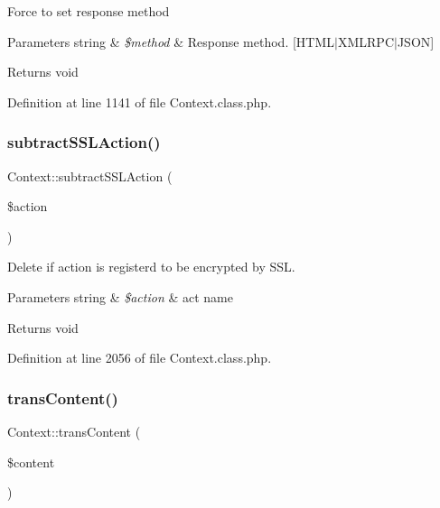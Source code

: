 Force to set response method


\begin{DoxyParams}[1]{Parameters}
string & {\em \$method} & Response method. \mbox{[}H\+T\+M\+L$\vert$\+X\+M\+L\+R\+P\+C$\vert$\+J\+S\+ON\mbox{]} \\
\hline
\end{DoxyParams}
\begin{DoxyReturn}{Returns}
void 
\end{DoxyReturn}


Definition at line 1141 of file Context.\+class.\+php.

\mbox{\label{classContext_a598cb5c571c0a1ffb15f67064e251f0d}} 
\subsubsection{\texorpdfstring{subtract\+S\+S\+L\+Action()}{subtractSSLAction()}}
{\footnotesize\ttfamily Context\+::subtract\+S\+S\+L\+Action (\begin{DoxyParamCaption}\item[{}]{\$action }\end{DoxyParamCaption})}

Delete if action is registerd to be encrypted by S\+SL.


\begin{DoxyParams}[1]{Parameters}
string & {\em \$action} & act name \\
\hline
\end{DoxyParams}
\begin{DoxyReturn}{Returns}
void 
\end{DoxyReturn}


Definition at line 2056 of file Context.\+class.\+php.

\mbox{\label{classContext_a4767b003bd726a994b1bf6bf68a3bb7e}} 
\subsubsection{\texorpdfstring{trans\+Content()}{transContent()}}
{\footnotesize\ttfamily Context\+::trans\+Content (\begin{DoxyParamCaption}\item[{}]{\$content }\end{DoxyParamCaption})}

